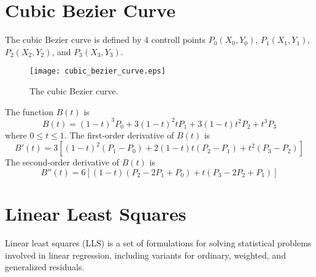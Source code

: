 \documentclass{turgon}
\begin{document}
\chapter{Cubic Bezier Curve}


The cubic Bezier curve is defined by 4 controll points $P_0(X_0, Y_0)$,
$P_1(X_1, Y_1)$, $P_2(X_2, Y_2)$, and $P_3(X_3, Y_3)$.
\begin{figure}[h]
    \centering
    \texttt{[image: cubic\_bezier\_curve.eps]}
    \caption{The cubic Bezier curve.}
    \label{f:cubic_bezier_curve}
\end{figure}

The function $B(t)$ is
\begin{equation}
    B(t) = (1-t)^3 P_0 + 3(1-t)^2 t P_1 + 3(1-t) t^2 P_2 + t^3 P_3
    \label{e:cbc:der0}
\end{equation}
where $0 \leq t \leq 1$.  The first-order derivative of $B(t)$ is
\begin{equation}
    B'(t) = 3\left[
      (1-t)^2 (P_1 - P_0) + 2(1-t)t(P_2 - P_1) + t^2(P_3 - P_2)
    \right]
\end{equation}
The second-order derivative of $B(t)$ is
\begin{equation}
    B''(t) = 6\left[(1-t)(P_2 - 2P_1 + P_0) + t(P_3 - 2P_2 + P_1)\right]
\end{equation}

\chapter{Linear Least Squares}


Linear least squares (LLS) is a set of formulations for solving statistical
problems involved in linear regression, including variants for ordinary,
weighted, and generalized residuals.
\end{document}
